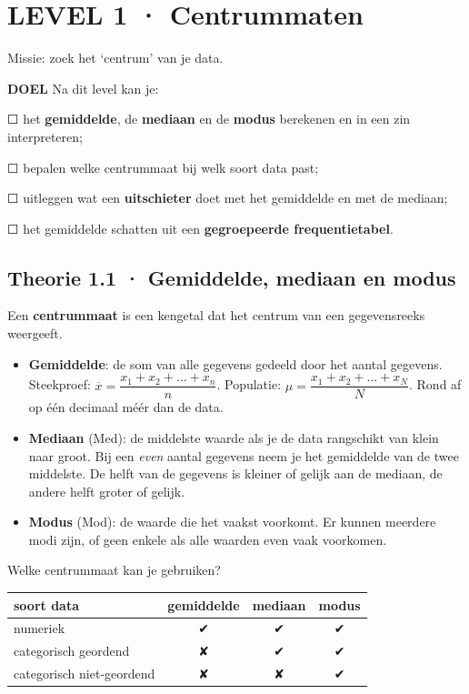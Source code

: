\section{LEVEL 1 · Centrummaten}

\begin{missie}
Missie: zoek het ‘centrum’ van je data.
\end{missie}

\begin{doel}
\textbf{DOEL} \quad Na dit level kan je:

☐ het \textbf{gemiddelde}, de \textbf{mediaan} en de \textbf{modus} berekenen en in een zin interpreteren;

☐ bepalen welke centrummaat bij welk soort data past;

☐ uitleggen wat een \textbf{uitschieter} doet met het gemiddelde en met de mediaan;

☐ het gemiddelde schatten uit een \textbf{gegroepeerde frequentietabel}.
\end{doel}

\subsection*{Theorie 1.1 · Gemiddelde, mediaan en modus}

\begin{theorie}
Een \textbf{centrummaat} is een kengetal dat het centrum van een gegevensreeks weergeeft.

\begin{itemize}
\item \textbf{Gemiddelde}: de som van alle gegevens gedeeld door het aantal gegevens. Steekproef: $\overline{x}=\dfrac{x_1+x_2+\dots+x_n}{n}$. Populatie: $\mu=\dfrac{x_1+x_2+\dots+x_N}{N}$. Rond af op één decimaal méér dan de data.
\item \textbf{Mediaan} (Med): de middelste waarde als je de data rangschikt van klein naar groot. Bij een \emph{even} aantal gegevens neem je het gemiddelde van de twee middelste. De helft van de gegevens is kleiner of gelijk aan de mediaan, de andere helft groter of gelijk.
\item \textbf{Modus} (Mod): de waarde die het vaakst voorkomt. Er kunnen meerdere modi zijn, of geen enkele als alle waarden even vaak voorkomen.
\end{itemize}

Welke centrummaat kan je gebruiken?

\begin{tabular}{lccc}
\hline
soort data & gemiddelde & mediaan & modus \\
\hline
numeriek & ✔ & ✔ & ✔ \\
categorisch geordend & ✘ & ✔ & ✔ \\
categorisch niet-geordend & ✘ & ✘ & ✔ \\
\hline
\end{tabular}
\end{theorie}

